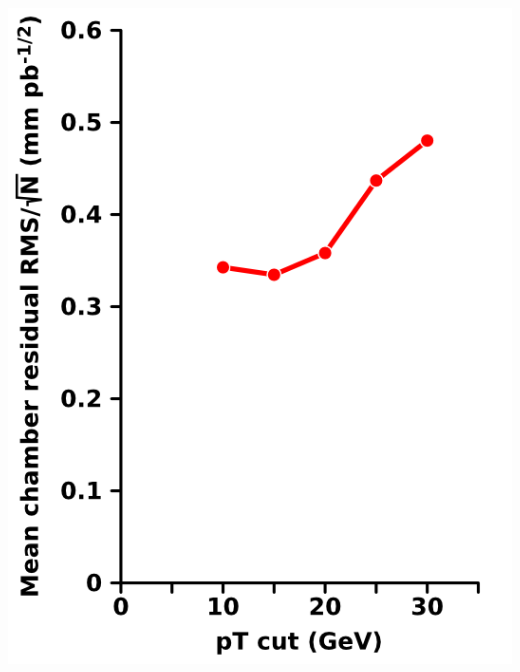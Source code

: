 \documentclass[compress]{beamer}
\begin{document}
\begin{frame}
\begin{columns}
\includegraphics[width=\linewidth]{collisions_resolution.png}
\end{columns}
\end{frame}
\end{document}
